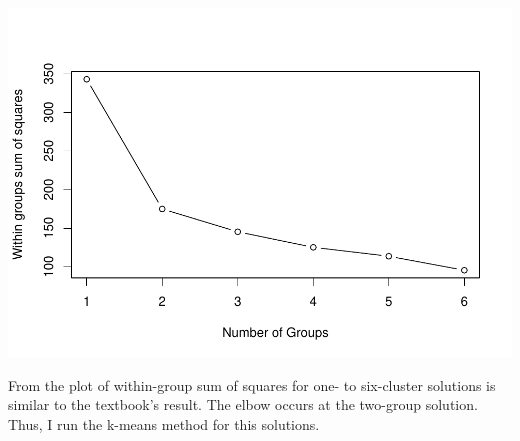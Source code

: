 \documentclass[
]{article}
\newenvironment{Shaded}{\begin{snugshade}}{\end{snugshade}}
\newcommand{\AttributeTok}[1]{\textcolor[rgb]{0.77,0.63,0.00}{#1}}
\newcommand{\CommentTok}[1]{\textcolor[rgb]{0.56,0.35,0.01}{\textit{#1}}}
\newcommand{\ControlFlowTok}[1]{\textcolor[rgb]{0.13,0.29,0.53}{\textbf{#1}}}
\newcommand{\DecValTok}[1]{\textcolor[rgb]{0.00,0.00,0.81}{#1}}
\newcommand{\ErrorTok}[1]{\textcolor[rgb]{0.64,0.00,0.00}{\textbf{#1}}}
\newcommand{\FunctionTok}[1]{\textcolor[rgb]{0.00,0.00,0.00}{#1}}
\newcommand{\NormalTok}[1]{#1}
\newcommand{\OtherTok}[1]{\textcolor[rgb]{0.56,0.35,0.01}{#1}}
\newcommand{\SpecialCharTok}[1]{\textcolor[rgb]{0.00,0.00,0.00}{#1}}
\newcommand{\StringTok}[1]{\textcolor[rgb]{0.31,0.60,0.02}{#1}}
\begin{document}
\begin{Shaded}
\end{Shaded}

\includegraphics[width=0.5\linewidth,height=0.5\textheight]{HUDM6122-Homework_06-Chenguang-Pan_files/figure-latex/unnamed-chunk-1-1}

From the plot of within-group sum of squares for one- to six-cluster
solutions is similar to the textbook's result. The elbow occurs at the
two-group solution. Thus, I run the k-means method for this solutions.
\end{document}
